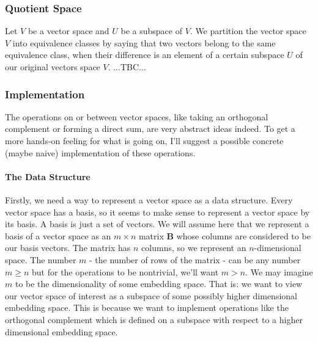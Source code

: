 



\subsubsection{Quotient Space}
Let $V$ be a vector space and $U$ be a subspace of $V$. We partition the vector space $V$ into equivalence classes by saying that two vectors belong to the same equivalence class, when their difference is an element of a certain subspace $U$ of our original vectors space $V$. ...TBC...




\subsubsection{Implementation}
The operations on or between vector spaces, like taking an orthogonal complement or forming a direct sum, are very abstract ideas indeed. To get a more hands-on feeling for what is going on, I'll suggest a possible concrete (maybe naive) implementation of these operations. 

\paragraph{The Data Structure}
Firstly, we need a way to represent a vector space as a data structure. Every vector space has a basis, so it seems to make sense to represent a vector space by its basis. A basis is just a set of vectors. We will assume here that we represent a basis of a vector space as an $m \times n$ matrix $\mathbf{B}$ whose columns are considered to be our basis vectors. The matrix has $n$ columns, so we represent an $n$-dimensional space. The number $m$ - the number of rows of the matrix - can be any number $m \geq n$ but for the operations to be nontrivial, we'll want $m > n$. We may imagine $m$ to be the dimensionality of some embedding space. That is: we want to view our vector space of interest as a subspace of some possibly higher dimensional embedding space. This is because we want to implement operations like the orthogonal complement which is defined on a subspace with respect to a higher dimensional embedding space. 



